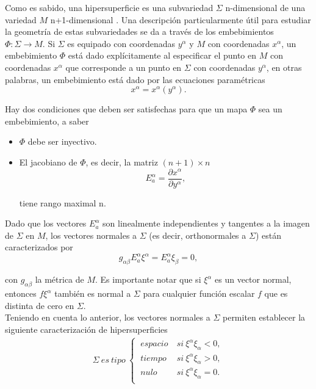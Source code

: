 \documentclass{article}
\numberwithin{equation}{section}
\theoremstyle{definition}
\begin{document}
Como es sabido, una hipersuperficie es una subvariedad $\Sigma$ n-dimensional de una variedad $M$ n+1-dimensional \cite{blau}. Una descripción particularmente útil para estudiar la geometría de estas subvariedades se da a través de los embebimientos $\Phi: \Sigma \to M$. Si $\Sigma$ es equipado con coordenadas $y^\alpha$ y $M$ con coordenadas $x^\alpha$, un embebimiento $\Phi$ está dado explícitamente al especificar el punto en $M$ con coordenadas $x^\alpha$ que corresponde a un punto en $\Sigma$ con coordenadas $y^\alpha$, en otras palabras, un embebimiento está dado por las ecuaciones paramétricas 
\begin{equation*}
x^\alpha = x^\alpha(y^\alpha).
\end{equation*}

Hay dos condiciones que deben ser satisfechas para que un mapa $\Phi$ sea un embebimiento, a saber
\begin{itemize}
	\item $\Phi$ debe ser inyectivo.
	\item El jacobiano de $\Phi$, es decir, la matriz $(n+1)\times n$
	\begin{equation*}
	E^{\alpha}_{a} = \frac{\partial x^\alpha}{\partial y^\alpha},
	\end{equation*}
	
	tiene rango maximal n.
\end{itemize}

Dado que los vectores $E^{\alpha}_{a}$ son linealmente independientes y tangentes a la imagen de $\Sigma$ en $M$, los vectores normales a $\Sigma$ (es decir, orthonormales a $\Sigma$) están caracterizados por 
\begin{equation*}
g_{\alpha \beta}E^{\alpha}_{a}\xi^{\alpha} = E^{\alpha}_{a}\xi_{\beta} = 0,
\end{equation*}

con $g_{\alpha \beta}$ la métrica de $M$. Es importante notar que si $\xi^{\alpha}$ es un vector normal, entonces $f\xi^{\alpha}$ también es normal a $\Sigma$ para cualquier función escalar $f$ que es distinta de cero en $\Sigma$.\\

Teniendo en cuenta lo anterior, los vectores normales a $\Sigma$ permiten establecer la siguiente caracterización de hipersuperficies
\begin{align*}
\Sigma\ es\ tipo\  
\begin{cases}
\ espacio\ & si\ \xi^{\alpha}\xi_{\alpha}<0,\\
\ tiempo\ & si\ \xi^{\alpha}\xi_{\alpha}>0,\\
\ nulo\ & si\ \xi^{\alpha}\xi_{\alpha}=0.\\
\end{cases}
\end{align*}
\end{document}
